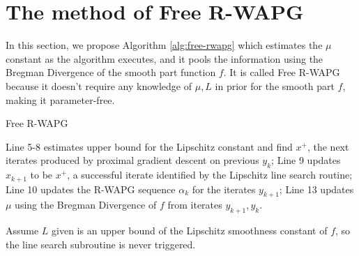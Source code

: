 \documentclass[12pt]{article}
\begin{document}
\section{The method of Free R-WAPG}\label{sec:free-rwapg}
    In this section, we propose Algorithm \ref{alg:free-rwapg} which estimates the $\mu$ constant as the algorithm executes, and it pools the information using the Bregman Divergence of the smooth part function $f$. 
    It is called Free R-WAPG because it doesn't require any knowledge of $\mu, L$ in prior for the smooth part $f$, making it parameter-free. 
    \begin{algorithm}
        \begin{algorithmic}[1]
        {\footnotesize
            \ENDWHILE
        \ENDFOR
        }
        \end{algorithmic}
        \caption{Free R-WAPG}
        \label{alg:free-rwapg}
    \end{algorithm}
    \par
    Line 5-8 estimates upper bound for the Lipschitz constant and find $x^+$, the next iterates produced by proximal gradient descent on previous $y_k$; 
    Line 9 updates $x_{k + 1}$ to be $x^+$, a successful iterate identified by the Lipschitz line search routine;
    Line 10 updates the R-WAPG sequence $\alpha_k$ for the iterates $y_{k + 1}$;
    Line 13 updates $\mu$ using the Bregman Divergence of $f$ from iterates $y_{k + 1}, y_k$. 
    \par
    Assume $L$ given is an upper bound of the Lipschitz smoothness constant of $f$, so the line search subroutine is never triggered. 
\end{document}
